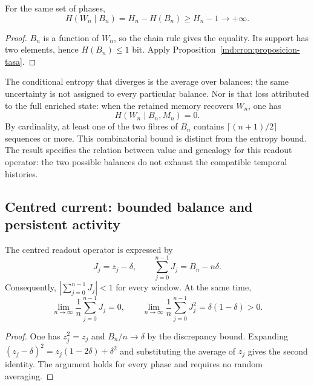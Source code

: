 \begin{corollary}
\label{md:cron:corolario-condicional}
For the same set of phases,
\begin{equation}
 H(W_n\mid B_n)=H_n-H(B_n)
 \geq H_n-1\longrightarrow+\infty.
 \label{md:cron:entropia-condicional}
\end{equation}
\end{corollary}
\begin{proof}
$B_n$ is a function of $W_n$, so the chain rule gives the equality.
Its support has two elements, hence $H(B_n)\leq1$ bit.
Apply Proposition~\ref{md:cron:proposicion-tasa}.
\end{proof}

The conditional entropy that diverges is the average over balances;
the same uncertainty is not assigned to every particular balance.
Nor is that loss attributed to the full enriched state: when the
retained memory recovers $W_n$, one has
\begin{equation}
 H(W_n\mid B_n,M_n)=0.
 \label{md:cron:restitucion-memoria}
\end{equation}
By cardinality, at least one of the two fibres of $B_n$ contains
$\lceil(n+1)/2\rceil$ sequences or more. This combinatorial bound is
distinct from the entropy bound.
The result specifies the relation between value and genealogy for this readout operator:
the two possible balances do not exhaust the compatible temporal histories.

\subsection{Centred current: bounded balance and persistent activity}
\label{md:cron:corriente}

The centred readout operator is expressed by
\begin{equation}
 J_j=z_j-\delta,\qquad
 \sum_{j=0}^{n-1}J_j=B_n-n\delta.
 \label{md:cron:corriente-definicion}
\end{equation}
Consequently,
$\left|\sum_{j=0}^{n-1}J_j\right|<1$ for every window.
At the same time,
\begin{equation}
 \lim_{n\to\infty}\frac1n\sum_{j=0}^{n-1}J_j=0,\qquad
 \lim_{n\to\infty}\frac1n\sum_{j=0}^{n-1}J_j^2
 =\delta(1-\delta)>0.
 \label{md:cron:actividad}
\end{equation}
\begin{proof}
One has $z_j^2=z_j$ and $B_n/n\to\delta$ by the discrepancy bound.
Expanding
$(z_j-\delta)^2=z_j(1-2\delta)+\delta^2$ and substituting the
average of $z_j$ gives the second identity.
The argument holds for every phase and requires no random averaging.
\end{proof}

